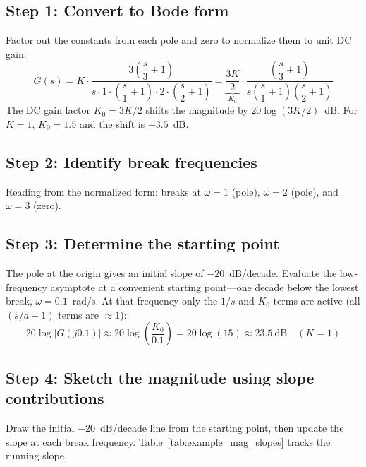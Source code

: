 \documentclass[12pt]{article}
\begin{document}
\subsection*{Step 1: Convert to Bode form}

Factor out the constants from each pole and zero to normalize them to unit
DC gain:
\begin{equation}
  G(s) = K \cdot \frac{3\!\left(\dfrac{s}{3}+1\right)}
                      {s \cdot 1\cdot\left(\dfrac{s}{1}+1\right)
                              \cdot 2\cdot\left(\dfrac{s}{2}+1\right)}
       = \underbrace{\frac{3K}{2}}_{\displaystyle K_0}
         \cdot
         \frac{\left(\dfrac{s}{3}+1\right)}
              {s\!\left(\dfrac{s}{1}+1\right)\!\left(\dfrac{s}{2}+1\right)}
  \label{eq:example_bode_form}
\end{equation}
The DC gain factor $K_0 = 3K/2$ shifts the magnitude by $20\log(3K/2)$~dB.
For $K = 1$, $K_0 = 1.5$ and the shift is $+3.5$~dB.

\subsection*{Step 2: Identify break frequencies}

Reading from the normalized form: breaks at $\omega = 1$ (pole), $\omega = 2$
(pole), and $\omega = 3$ (zero).

\subsection*{Step 3: Determine the starting point}

The pole at the origin gives an initial slope of $-20$~dB/decade.  Evaluate
the low-frequency asymptote at a convenient starting point---one decade below
the lowest break, $\omega = 0.1$~rad/s.  At that frequency only the $1/s$ and
$K_0$ terms are active (all $(s/a+1)$ terms are $\approx 1$):
\begin{equation}
  20\log|G(j0.1)| \approx 20\log\!\left(\frac{K_0}{0.1}\right)
    = 20\log(15) \approx 23.5~\text{dB} \quad (K=1)
  \label{eq:example_start}
\end{equation}

\subsection*{Step 4: Sketch the magnitude using slope contributions}

Draw the initial $-20$~dB/decade line from the starting point, then update
the slope at each break frequency.  Table~\ref{tab:example_mag_slopes} tracks
the running slope.
\end{document}
